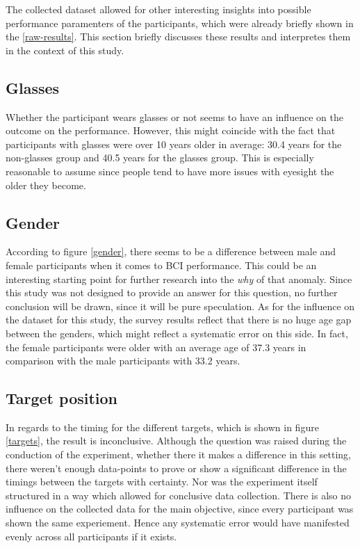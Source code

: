             The collected dataset allowed for other interesting insights into possible performance paramenters of the participants, which were already briefly shown in the \ref*{raw-results}. This section briefly discusses these results and interpretes them in the context of this study.

            \subsection{Glasses}

                Whether the participant wears glasses or not seems to have an influence on the outcome on the performance. However, this might coincide with the fact that participants with glasses were over 10 years older in average: 30.4 years for the non-glasses group and 40.5 years for the glasses group. This is especially reasonable to assume since people tend to have more issues with eyesight the older they become.  

            \subsection{Gender}

                According to figure \ref*{gender}, there seems to be a difference between male and female participants when it comes to BCI performance. This could be an interesting starting point for further research into the \textit{why} of that anomaly. Since this study was not designed to provide an answer for this question, no further conclusion will be drawn, since it will be pure speculation. As for the influence on the dataset for this study, the survey results reflect that there is no huge age gap between the genders, which might reflect a systematic error on this side. In fact, the female participants were older with an average age of 37.3 years in comparison with the male participants with 33.2 years.

            \subsection{Target position}

                In regards to the timing for the different targets, which is shown in figure \ref*{targets}, the result is inconclusive. Although the question was raised during the conduction of the experiment, whether there it makes a difference in this setting, there weren't enough data-points to prove or show a significant difference in the timings between the targets with certainty. Nor was the experiment itself structured in a way which allowed for conclusive data collection. There is also no influence on the collected data for the main objective, since every participant was shown the same experiement. Hence any systematic error would have manifested evenly across all participants if it exists.

